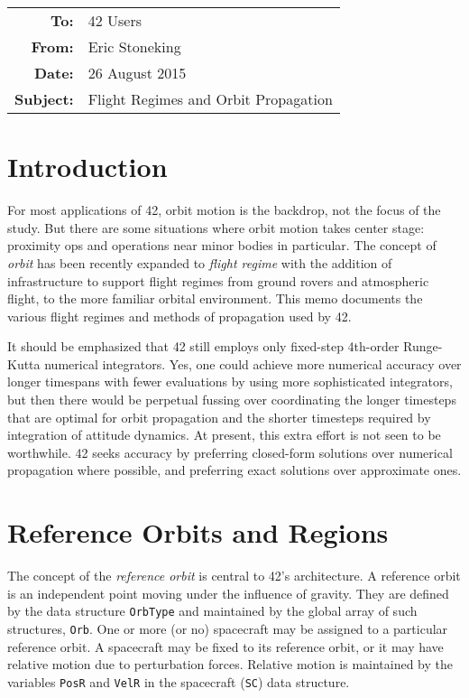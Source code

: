 \documentclass[12pt]{article}
\begin{document}
\begin{tabular}{@{} rl @{}}
    {\bf To:} & 42 Users \\ 
    {\bf From:} & Eric Stoneking \\ 
    {\bf Date:} &  26 August 2015\\ 
    {\bf Subject:} & Flight Regimes and Orbit Propagation \\ 
\hline
\end{tabular}
  
  
\section{Introduction}

For most applications of 42, orbit motion is the backdrop, not the focus of the study.  But there are some situations where orbit motion takes center stage: proximity ops and operations near minor bodies in particular.  The concept of {\em orbit} has been recently expanded to {\em flight regime} with the addition of infrastructure to support flight regimes from ground rovers and atmospheric flight, to the more familiar orbital environment.  This memo  documents the various flight regimes and methods of propagation used by 42.

It should be emphasized that 42 still employs only fixed-step 4th-order Runge-Kutta numerical integrators.  Yes, one could achieve more numerical accuracy over longer timespans with fewer evaluations by using more sophisticated integrators, but then there would be perpetual fussing over coordinating the longer timesteps that are optimal for orbit propagation and the shorter timesteps required by integration of attitude dynamics.  At present, this extra effort is not seen to be worthwhile.  42 seeks accuracy by preferring closed-form solutions over numerical propagation where possible, and preferring exact solutions over approximate ones.

\section{Reference Orbits and Regions}

The concept of the {\em reference orbit} is central to 42's architecture.  A reference orbit is an independent point moving under the influence of gravity.  They are defined by the data structure {\tt OrbType} and maintained by the global array of such structures, {\tt Orb}.  One or more (or no) spacecraft may be assigned to a particular reference orbit.  A spacecraft may be fixed to its reference orbit, or it may have relative motion due to perturbation forces.  Relative motion is maintained by the variables {\tt PosR} and {\tt VelR} in the spacecraft ({\tt SC}) data structure.
\end{document}
